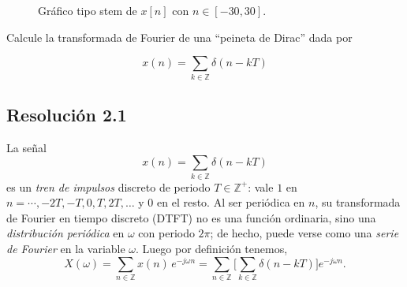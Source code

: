 \documentclass[
  11pt,
  letterpaper,
   addpoints,
   answers
  ]{exam}
\begin{document}
\begin{questions}
\begin{solution}
\begin{figure}[H]
\caption{Gráfico tipo stem de $x[n]$ con $n\in[-30,30]$.}
\label{fig:xn_piecewise_stem}
\end{figure}

\end{solution}

\question Calcule la transformada de Fourier de una ``peineta de Dirac'' dada por

\begin{equation*}
  x(n) = \sum_{k \in \mathbb{Z}} \delta(n - kT)
\end{equation*}

\begin{solution}
\subsection*{Resolución 2.1}

La señal
\[
x(n)=\sum_{k\in\mathbb{Z}}\delta(n-kT)
\]
es un \emph{tren de impulsos} discreto de periodo $T\in\mathbb{Z}^+$: vale $1$ en $n=\cdots,-2T,-T,0,T,2T,\dots$ y $0$ en el resto. Al ser periódica en $n$, su transformada de Fourier en tiempo discreto (DTFT) no es una función ordinaria, sino una \emph{distribución periódica} en $\omega$ con periodo $2\pi$; de hecho, puede verse como una \emph{serie de Fourier} en la variable $\omega$. Luego por definición tenemos,
\[
X(\omega)=\sum_{n\in\mathbb{Z}} x(n)\,e^{-j\omega n}
=\sum_{n\in\mathbb{Z}}\Bigg[\sum_{k\in\mathbb{Z}}\delta(n-kT)\Bigg]e^{-j\omega n}.
\]


\end{solution}
\end{questions}
\end{document}

